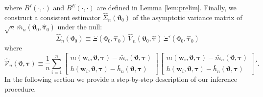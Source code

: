 where $B^I(\cdot, \cdot)$ and $B^E(\cdot, \cdot)$ are defined in Lemma \ref{lem:prelim}.
Finally, we construct a consistent estimator $\widehat{\Sigma}_n(\boldsymbol{\vartheta}_0)$ of the asymptotic variance matrix of $\sqrt{n}\, \bar{m}_n(\boldsymbol{\vartheta}_0, \widehat{\boldsymbol{\tau}}_0)$ under the null:
\begin{equation}
  \widehat{\Sigma}_n(\boldsymbol{\vartheta}_0) \equiv \Xi(\boldsymbol{\vartheta}_0, \widehat{\boldsymbol{\tau}}_0)\, \widehat{\mathcal{V}}_n(\boldsymbol{\vartheta}_0, \widehat{\boldsymbol{\tau}})\,\Xi'(\boldsymbol{\vartheta}_0, \widehat{\boldsymbol{\tau}}_0)
  \label{eq:AvarEst}
\end{equation}
where
\begin{equation}
  \widehat{\mathcal{V}}_n(\boldsymbol{\vartheta}, \boldsymbol{\tau}) \equiv \frac{1}{n} \sum_{i=1}^n
\left[
\begin{array}{c}
  m(\mathbf{w}_i, \boldsymbol{\vartheta}, \boldsymbol{\tau}) - \bar{m}_n(\boldsymbol{\vartheta}, \boldsymbol{\tau}) \\
  h(\mathbf{w}_i, \boldsymbol{\vartheta}, \boldsymbol{\tau}) -  \bar{h}_n(\boldsymbol{\vartheta}, \boldsymbol{\tau}) 
\end{array}
\right]
\left[
\begin{array}{c}
  m(\mathbf{w}_i, \boldsymbol{\vartheta}, \boldsymbol{\tau}) - \bar{m}_n(\boldsymbol{\vartheta}, \boldsymbol{\tau}) \\
  h(\mathbf{w}_i, \boldsymbol{\vartheta}, \boldsymbol{\tau}) -  \bar{h}_n(\boldsymbol{\vartheta}, \boldsymbol{\tau}) 
\end{array}
\right]'.
\label{eq:fullVar}
\end{equation}
In the following section we provide a step-by-step description of our inference procedure.



